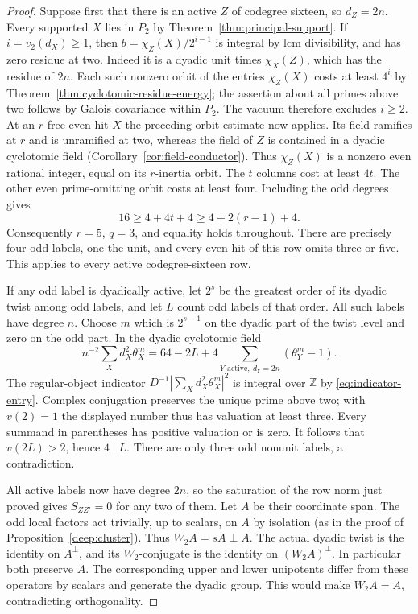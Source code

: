 \documentclass[11pt,a4paper]{article}
\numberwithin{equation}{section}
\theoremstyle{remark}
\newcommand{\ZZ}{\mathbb Z}
\begin{document}
\begin{proof}
Suppose first that there is an active $Z$ of codegree sixteen,
so $d_Z=2n$. Every supported $X$ lies in $P_2$ by
Theorem~\ref{thm:principal-support}. If $i=v_2(d_X)\ge1$,
then $b=\chi_Z(X)/2^{i-1}$ is integral by lcm divisibility,
and has zero residue at two. Indeed it is a dyadic unit times
$\chi_X(Z)$, which has the residue of $2n$. Each such nonzero
orbit of the entries $\chi_Z(X)$ costs at least $4^i$ by
Theorem~\ref{thm:cyclotomic-residue-energy}; the assertion about
all primes above two follows by Galois covariance within $P_2$.
The vacuum therefore excludes $i\ge2$.
At an $r$-free even hit $X$ the preceding orbit estimate now applies.
Its field ramifies at $r$ and is unramified at two, whereas the
field of $Z$ is contained in a dyadic cyclotomic field
(Corollary~\ref{cor:field-conductor}). Thus $\chi_Z(X)$ is a
nonzero even rational integer, equal on its $r$-inertia orbit.
The $t$ columns cost at least $4t$. The other even prime-omitting
orbit costs at least four. Including the odd degrees gives
\[
                  16\ge 4+4t+4\ge 4+2(r-1)+4 .
\]
Consequently $r=5$, $q=3$, and equality holds throughout. There
are precisely four odd labels, one the unit, and every even hit of
this row omits three or five. This applies to every active
codegree-sixteen row.

If any odd label is dyadically active, let $2^s$ be the greatest
order of its dyadic twist among odd labels, and let $L$ count odd
labels of that order. All such labels have degree $n$. Choose $m$
which is $2^{s-1}$ on the dyadic part of the twist level and zero
on the odd part. In the dyadic cyclotomic field
\[
 n^{-2}\sum_X d_X^2\theta_X^m
       =64-2L+4\sum_{Y\text{ active},\ d_Y=2n}(\theta_Y^m-1).
\]
The regular-object indicator $D^{-1}|\sum_Xd_X^2\theta_X^m|^2$
is integral over $\ZZ$ by \eqref{eq:indicator-entry}.
Complex conjugation preserves the unique prime above two; with
$v(2)=1$ the displayed number thus has valuation at least three.
Every summand in parentheses has positive valuation or is zero.
It follows that $v(2L)>2$, hence $4\mid L$. There are only three
odd nonunit labels, a contradiction.

All active labels now have degree $2n$, so the saturation of the row
norm just proved gives $S_{ZZ'}=0$ for any two of them. Let $A$
be their coordinate span. The odd local factors act trivially, up
to scalars, on $A$ by isolation (as in the proof of
Proposition~\ref{deep:cluster}). Thus $W_2 A=sA\perp A$. The actual
dyadic twist is the identity on $A^\perp$, and its $W_2$-conjugate
is the identity on $(W_2 A)^\perp$. In particular both preserve
$A$. The corresponding upper and lower unipotents differ from these
operators by scalars and generate the dyadic group. This would make
$W_2 A=A$, contradicting orthogonality.


\end{proof}
\end{document}
